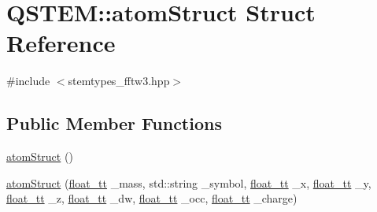 \hypertarget{struct_q_s_t_e_m_1_1atom_struct}{\section{Q\-S\-T\-E\-M\-:\-:atom\-Struct Struct Reference}
\label{struct_q_s_t_e_m_1_1atom_struct}
}


{\ttfamily \#include $<$stemtypes\-\_\-fftw3.\-hpp$>$}

\subsection*{Public Member Functions}
\begin{DoxyCompactItemize}
\item 
\hyperlink{struct_q_s_t_e_m_1_1atom_struct_aa44a221ee4aa2d778862c3d950df6c1c}{atom\-Struct} ()
\item 
\hyperlink{struct_q_s_t_e_m_1_1atom_struct_a4709812849cd4e6df9a71cd733884876}{atom\-Struct} (\hyperlink{namespace_q_s_t_e_m_a915d7caa497280d9f927c4ce8d330e47}{float\-\_\-tt} \-\_\-mass, std\-::string \-\_\-symbol, \hyperlink{namespace_q_s_t_e_m_a915d7caa497280d9f927c4ce8d330e47}{float\-\_\-tt} \-\_\-x, \hyperlink{namespace_q_s_t_e_m_a915d7caa497280d9f927c4ce8d330e47}{float\-\_\-tt} \-\_\-y, \hyperlink{namespace_q_s_t_e_m_a915d7caa497280d9f927c4ce8d330e47}{float\-\_\-tt} \-\_\-z, \hyperlink{namespace_q_s_t_e_m_a915d7caa497280d9f927c4ce8d330e47}{float\-\_\-tt} \-\_\-dw, \hyperlink{namespace_q_s_t_e_m_a915d7caa497280d9f927c4ce8d330e47}{float\-\_\-tt} \-\_\-occ, \hyperlink{namespace_q_s_t_e_m_a915d7caa497280d9f927c4ce8d330e47}{float\-\_\-tt} \-\_\-charge)
\end{DoxyCompactItemize}
